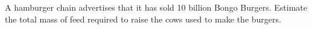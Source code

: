 A hamburger chain advertises that it has sold 10 billion
Bongo Burgers. Estimate the total mass of feed required to
raise the cows used to make the burgers.
